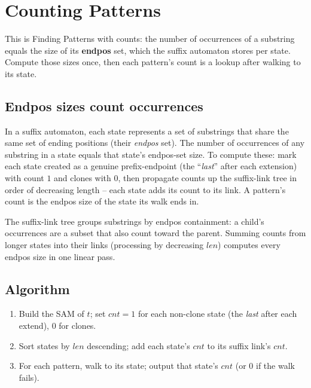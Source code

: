 \section{Counting Patterns}
\label{sec:cses-counting-patterns}


\begin{patternbox}
This is Finding Patterns with counts: the number of occurrences of a
substring equals the size of its \textbf{endpos} set, which the suffix
automaton stores per state. Compute those sizes once, then each pattern's
count is a lookup after walking to its state.
\end{patternbox}

\subsection*{Endpos sizes count occurrences}

In a suffix automaton, each state represents a set of substrings that
share the same set of ending positions (their \emph{endpos} set). The
number of occurrences of any substring in a state equals that state's
endpos-set size. To compute these: mark each state created as a genuine
prefix-endpoint (the ``\textit{last}'' after each extension) with count
$1$ and clones with $0$, then propagate counts up the suffix-link tree in
order of decreasing length -- each state adds its count to its link. A
pattern's count is the endpos size of the state its walk ends in.

\begin{ideabox}
The suffix-link tree groups substrings by endpos containment: a child's
occurrences are a subset that also count toward the parent. Summing counts
from longer states into their links (processing by decreasing $\textit{len}$)
computes every endpos size in one linear pass.
\end{ideabox}

\subsection*{Algorithm}

\begin{enumerate}
  \item Build the SAM of $t$; set $\textit{cnt}=1$ for each non-clone
        state (the \textit{last} after each extend), $0$ for clones.
  \item Sort states by $\textit{len}$ descending; add each state's
        $\textit{cnt}$ to its suffix link's $\textit{cnt}$.
  \item For each pattern, walk to its state; output that state's
        $\textit{cnt}$ (or $0$ if the walk fails).
\end{enumerate}

